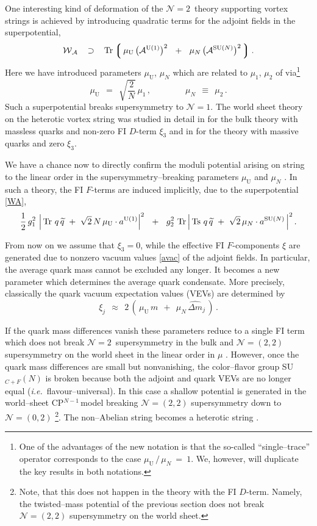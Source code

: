 \documentclass[12pt]{article}
\def\beq{\begin{equation}}
\def\eeq{\end{equation}}
\newcommand{\nonen}{${\mathcal N}=1$}
\newcommand{\ntwon}{${\mathcal N}=2$}
\newcommand{\ntwot}{${\mathcal N}= \left(2,2\right) $ }
\newcommand{\ntwoo}{${\mathcal N}= \left(0,2\right) $ }
\newcommand{\wt}{\widetilde}
\newcommand{\mc}[1]{\mathcal{#1}}
\newcommand{\mw}{\mathcal{W}}
\newcommand{\ma}{\mathcal{A}}
\newcommand{\lgr}{\left\lgroup}
\newcommand{\rgr}{\right\rgroup}
\newcommand{\AU}{\mc{A}^{\rm U(1)}}
\newcommand{\AN}{\mc{A}^\text{SU($N$)}}
\newcommand{\aU}{a^{\rm U(1)}}
\newcommand{\aN}{a^\text{SU($N$)}}
\newcommand{\muU}{\mu_\text{U}}
\newcommand{\cpn}{CP$^{N-1}$\,}
\newcommand{\qt}{\wt{q}}
\newcommand{\Tr}{\text{Tr}}
\newcommand{\Ts}{\text{Ts}}
\newcommand{\dm}{\hat{{\scriptstyle \Delta} m}}
\newcommand{\ie}{{\it i.e.}~}
\begin{document}
	One interesting kind of deformation of the \ntwon\, theory supporting vortex strings is
	achieved by introducing quadratic terms for the adjoint fields in the superpotential,
\beq
\label{WA}
	\mw{}_\ma    ~~\:\supset\:~~    \Tr \lgr\, \muU\, \big( \AU \big)^2   ~~+~~  \mu_N\, \big( \AN \big)^2 \,\rgr.
\eeq
	Here we have introduced parameters $ \muU $, $ \mu_N $ which are related to $ \mu_1 $, $ \mu_2 $ of \cite{SY1} via\footnote{
	One of the advantages of the new notation is that the so-called ``single--trace'' operator
	corresponds to the case $ \muU \,/\, \mu_N  ~=~ 1 $.
	We, however, will duplicate the key results in both notations.}
\beq
	\muU    ~~=~~    \sqrt{\frac{2}{N}}\, \mu_1\,,
	\qquad\qquad
	\mu_N    ~~\equiv~~    \mu_2\,.
\eeq
	Such a superpotential breaks supersymmetry to \nonen. 
	The world sheet theory on the heterotic vortex string was studied in detail in \cite{Edalati,SY1,BSY3} 
	for the bulk theory with massless quarks and non-zero FI $D$-term $ \xi_3 $ and in \cite{Shifman:2010kr} for the 
	theory with massive quarks and zero $ \xi_3 $.

	We have a chance now to directly confirm the moduli potential arising on string to the linear order
	in the supersymmetry--breaking parameters $ \muU $ and $ \mu_N $ \cite{Shifman:2010kr}.
	In such a theory, the FI $ F $-terms are induced implicitly, due to the superpotential \eqref{WA},
\beq
\label{FIFterms}
	\frac{1}{2}\,g_1^2~ \Big|\, \Tr~ q\, \qt ~+~ \sqrt{2}\, N\, \muU \cdot \aU \Big|^2
	~~+~~
	g_2^2~ \Tr\, \Big|\, \Ts~ q\, \qt ~+~ \sqrt{2}\, \mu_N \cdot \aN \,\Big|^2\,.
\eeq

	From now on we assume that $\xi_3=0$, while the effective FI $F$-components  $\xi$ are generated due to nonzero
	vacuum values \eqref{avac} of the adjoint fields. 
	In particular, the average quark mass cannot be excluded any longer. 
	It becomes a new parameter which determines the average quark condensate. 
	More precisely, classically the quark vacuum expectation values (VEVs) are determined by
\beq
\label{xij}
	\xi_j    ~~\approx~~    2\, \left(\, \muU\,m  ~~+~~  \mu_N\,\dm{}_j \,\right)\,.
\eeq

	If the quark mass differences vanish these parameters reduce to a single FI term 
	which does not break \ntwon\, supersymmetry in the bulk and 
	\ntwot supersymmetry on the world sheet in the linear order in $\mu$ \cite{HSZ,VY}. 
	However, once the quark mass differences are small but nonvanishing, the color--flavor group SU$_{C+F}(N)$ is broken 
	because both the adjoint and quark VEVs are no longer equal (\ie flavour--universal). 
	In this case a shallow potential is generated in the world--sheet \cpn model
	breaking \ntwot supersymmetry down to \ntwoo \cite{Shifman:2010kr}\footnote{Note, that this does not happen 
	in the theory with the FI $D$-term. 
	Namely, the twisted--mass potential of the previous section 
	does not break \ntwot supersymmetry on the world sheet.}. 
	The non--Abelian string becomes a heterotic string \cite{Edalati,SY1}.
\end{document}
